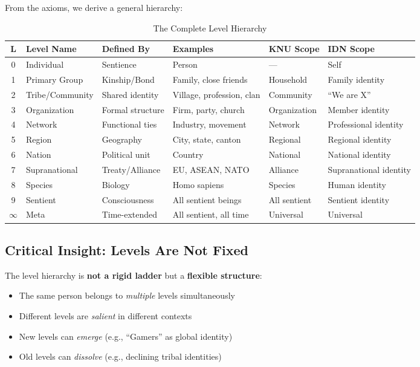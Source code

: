From the axioms, we derive a general hierarchy:

\begin{table}[htbp]
\centering
\caption{The Complete Level Hierarchy}
\label{tab:aaa-hierarchy}
\renewcommand{\arraystretch}{1.4}
\begin{tabular}{@{}clllll@{}}
\toprule
\textbf{L} & \textbf{Level Name} & \textbf{Defined By} & \textbf{Examples} & \textbf{KNU Scope} & \textbf{IDN Scope} \\
\midrule
0 & Individual & Sentience & Person & --- & Self \\
1 & Primary Group & Kinship/Bond & Family, close friends & Household & Family identity \\
2 & Tribe/Community & Shared identity & Village, profession, clan & Community & ``We are X'' \\
3 & Organization & Formal structure & Firm, party, church & Organization & Member identity \\
4 & Network & Functional ties & Industry, movement & Network & Professional identity \\
5 & Region & Geography & City, state, canton & Regional & Regional identity \\
6 & Nation & Political unit & Country & National & National identity \\
7 & Supranational & Treaty/Alliance & EU, ASEAN, NATO & Alliance & Supranational identity \\
8 & Species & Biology & Homo sapiens & Species & Human identity \\
9 & Sentient & Consciousness & All sentient beings & All sentient & Sentient identity \\
$\infty$ & Meta & Time-extended & All sentient, all time & Universal & Universal \\
\bottomrule
\end{tabular}
\end{table}

\subsection{Critical Insight: Levels Are Not Fixed}

\begin{tcolorbox}[colback=yellow!10!white, colframe=yellow!50!black, title=Key Insight]
The level hierarchy is \textbf{not a rigid ladder} but a \textbf{flexible structure}:
\begin{itemize}
\item The same person belongs to \emph{multiple} levels simultaneously
\item Different levels are \emph{salient} in different contexts
\item New levels can \emph{emerge} (e.g., ``Gamers'' as global identity)
\item Old levels can \emph{dissolve} (e.g., declining tribal identities)
\end{itemize}
\end{tcolorbox}

